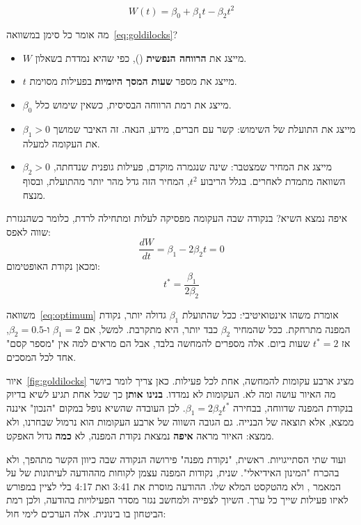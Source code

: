 \begin{eqbox}
\begin{equation}
W(t) = \beta_0 + \beta_1 t - \beta_2 t^2
\label{eq:goldilocks}
\end{equation}
\end{eqbox}

מה אומר כל סימן במשוואה~\eqref{eq:goldilocks}?

\begin{itemize}
  \item $W$ מייצג את \textbf{הרווחה הנפשית} (), כפי שהיא נמדדת בשאלון.
  \item $t$ מייצג את מספר \textbf{שעות המסך היומיות} בפעילות מסוימת.
  \item $\beta_0$ מייצג את רמת הרווחה הבסיסית, כשאין שימוש כלל.
  \item $\beta_1 > 0$ מייצג את התועלת של השימוש: קשר עם חברים, מידע, הנאה. זה האיבר שמושך את העקומה למעלה.
  \item $\beta_2 > 0$ מייצג את המחיר שמצטבר: שינה שנגמרה מוקדם, פעילות גופנית שנדחתה, השוואה מתמדת לאחרים. בגלל הריבוע $t^2$, המחיר הזה גדל מהר יותר מהתועלת, ובסוף מנצח.
\end{itemize}

איפה נמצא השיא? בנקודה שבה העקומה מפסיקה לעלות ומתחילה לרדת, כלומר כשהנגזרת שווה לאפס:
\[
\frac{dW}{dt} = \beta_1 - 2\beta_2 t = 0
\]
ומכאן נקודת האופטימום:
\begin{equation}
t^{*} = \frac{\beta_1}{2\beta_2}
\label{eq:optimum}
\end{equation}

משוואה~\eqref{eq:optimum} אומרת משהו אינטואיטיבי: ככל שהתועלת $\beta_1$ גדולה יותר, נקודת המפנה מתרחקת. ככל שהמחיר $\beta_2$ כבד יותר, היא מתקרבת. למשל, אם $\beta_1 = 2$ ו-$\beta_2 = 0.5$, אז $t^{*} = 2$ שעות ביום. אלה מספרים להמחשה בלבד, אבל הם מראים למה אין "מספר קסם" אחד לכל המסכים.



איור~\ref{fig:goldilocks} מציג ארבע עקומות להמחשה, אחת לכל פעילות. כאן צריך לומר ביושר מה האיור עושה ומה לא. העקומות לא נמדדו. \textbf{בנינו אותן} כך שכל אחת תגיע לשיא בדיוק בנקודת המפנה שדווחה, בבחירה $\beta_1 = 2\beta_2 t^{*}$. לכן העובדה שהשיא נופל במקום "הנכון" איננה ממצא, אלא תוצאה של הבנייה. גם הגובה השווה של ארבע העקומות הוא נרמול שבחרנו, ולא ממצא: האיור מראה \textbf{איפה} נמצאת נקודת המפנה, לא \textbf{כמה} גדול האפקט.

ועוד שתי הסתייגויות. ראשית, "נקודת מפנה" פירושה הנקודה שבה כיוון הקשר מתהפך, ולא בהכרח "המינון האידיאלי". שנית, נקודות המפנה עצמן לקוחות מההודעה לעיתונות של  על המאמר \parencite{oii2017press, przybylski2017}, ולא מהטקסט המלא שלו. ההודעה מוסרת את \num{3:41} ואת \num{4:17} בלי לציין במפורש לאיזו פעילות שייך כל ערך. השיוך לצפייה ולמחשב נגזר מסדר הפעילויות בהודעה, ולכן רמת הביטחון בו בינונית. אלה הערכים לימי חול:

